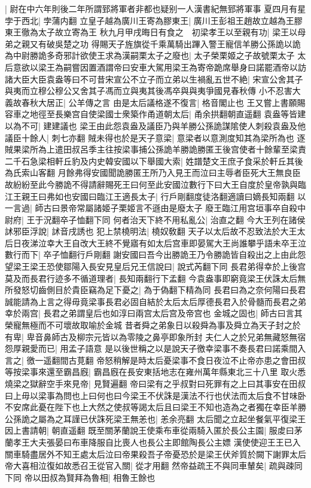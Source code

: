 |{
	尉在中六年則後二年所謂郅將軍者非都也疑别一人漢書紀無郅將軍事}
夏四月有星孛于西北|{
	孛蒲内翻}
立皇子越為廣川王寄為膠東王|{
	廣川王彭祖王趙故立越為王膠東王徹為太子故立寄為王}
秋九月甲戌晦日有食之　初梁孝王以至親有功|{
	梁王以母弟之親又有破吳楚之功}
得賜天子旌旗從千乘萬騎出蹕入警王寵信羊勝公孫詭以詭為中尉勝詭多奇邪計欲使王求為漢嗣栗太子之廢也|{
	太子榮栗姬之子故號栗太子}
太后意欲以梁王為嗣嘗因置酒謂帝曰安車大駕用梁王為寄帝跪席舉身曰諾罷酒帝以訪諸大臣大臣袁盎等曰不可昔宋宣公不立子而立弟以生禍亂五世不絶|{
	宋宣公舍其子與夷而立穆公穆公又舍其子馮而立與夷其後馮卒與與夷爭國見春秋傳}
小不忍害大義故春秋大居正|{
	公羊傳之言}
由是太后議格遂不復言|{
	格音閣止也}
王又嘗上書願賜容車之地徑至長樂宫自使梁國士衆築作甬道朝太后|{
	甬余拱翻朝直遥翻}
袁盎等皆建以為不可|{
	建建議也}
梁王由此怨袁盎及議臣乃與羊勝公孫詭謀隂使人刺殺袁盎及他議臣十餘人|{
	刺七亦翻}
賊未得也於是天子意梁|{
	意梁者以意測度知其為梁所為也}
逐賊果梁所為上遣田叔呂季主往按梁事捕公孫詭羊勝詭勝匿王後宫使者十餘輩至梁責二千石急梁相軒丘豹及内史韓安國以下舉國大索|{
	姓譜楚文王庶子食采於軒丘其後為氏索山客翻}
月餘弗得安國聞詭勝匿王所乃入見王而泣曰主辱者臣死大王無良臣故紛紛至此今勝詭不得請辭賜死王曰何至此安國泣數行下曰大王自度於皇帝孰與臨江王親王曰弗如也安國曰臨江王適長太子|{
	行戶剛翻度徒洛翻適讀曰嫡長知兩翻}
以一言過|{
	師古曰景帝常屬諸姬子栗姬言不遜由是廢太子}
廢王臨江用宫垣事卒自殺中尉府|{
	王于況翻卒子恤翻下同}
何者治天下終不用私亂公|{
	治直之翻}
今大王列在諸侯訹邪臣浮說|{
	訹音戌誘也}
犯上禁橈明法|{
	橈奴敎翻}
天子以太后故不忍致法於大王太后日夜涕泣幸大王自改大王終不覺寤有如太后宫車即晏駕大王尚誰攀乎語未卒王泣數行而下|{
	卒子恤翻行戶剛翻}
謝安國曰吾今出勝詭王乃令勝詭皆自殺出之上由此怨望梁王梁王恐使鄒陽入長安見皇后兄王信說曰|{
	說式芮翻下同}
長君弟得幸於上後宫莫及而長君行迹多不循道理者|{
	長知兩翻行下孟翻}
今袁盎事即窮竟梁王伏誅太后無所發怒切齒側目於貴臣竊為足下憂之|{
	為于偽翻下精為同}
長君曰為之奈何陽曰長君誠能請為上言之得毋竟梁事長君必固自結於太后太后厚德長君入於骨髓而長君之弟幸於兩宫|{
	長君之弟謂皇后也如淳曰兩宫太后宫及帝宫也}
金城之固也|{
	師古曰言其榮寵無極而不可壞故取喻於金城}
昔者舜之弟象日以殺舜為事及舜立為天子封之於有卑|{
	卑音鼻師古及柳宗元皆以為零陵之鼻亭即象所封}
夫仁人之於兄弟無藏怒無宿怨厚親愛而已|{
	用孟子語意}
是以後世稱之以是說天子徼幸梁事不奏長君曰諾乘間入言之|{
	徼一遥翻間古莧翻}
帝怒稍解是時太后憂梁事不食日夜泣不止帝亦患之會田叔等按梁事來還至霸昌廐|{
	霸昌廐在長安東括地志在雍州萬年縣東北三十八里}
取火悉燒梁之獄辭空手來見帝|{
	見賢遍翻}
帝曰梁有之乎叔對曰死罪有之上曰其事安在田叔曰上毋以梁事為問也上曰何也曰今梁王不伏誅是漢法不行也伏法而太后食不甘味卧不安席此憂在陛下也上大然之使叔等謁太后且曰梁王不知也造為之者獨在幸臣羊勝公孫詭之屬為之耳謹已伏誅死梁王無恙也|{
	恙余亮翻}
太后聞之立起坐餐氣平復梁王因上書請朝|{
	朝直遥翻}
既至關茅蘭說王使乘布車從兩騎入匿於長公主園|{
	服䖍曰茅蘭孝王大夫張晏曰布車降服自比喪人也長公主即館陶長公主嫖}
漢使使迎王王已入關車騎盡居外不知王處太后泣曰帝果殺吾子帝憂恐於是梁王伏斧質於闕下謝罪太后帝大喜相泣復如故悉召王從官入關|{
	從才用翻}
然帝益疏王不與同車輦矣|{
	疏與疎同下同}
帝以田叔為賢拜為魯相|{
	相魯王餘也}


